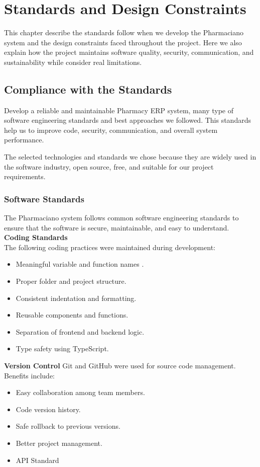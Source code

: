 \chapter{Standards and Design Constraints}
This chapter describe the standards follow when we develop the Pharmaciano system and the design constraints faced throughout the project. Here we also explain how the project maintains software quality, security, communication, and sustainability while consider real limitations.

\section{Compliance with the Standards}
Develop a reliable and maintainable Pharmacy ERP system, many type of software engineering standards and best approaches we followed. This standards help us to improve code, security, communication, and overall system performance.

The selected technologies and standards we chose because they are widely used in the software industry, open source, free, and suitable for our project requirements.

\subsection{Software Standards}
The Pharmaciano system follows common software engineering standards to ensure that the software is secure, maintainable, and easy to understand.
\\
\textbf{Coding Standards}\\
The following coding practices were maintained during development:
\begin{itemize}
\item Meaningful variable and function names \cite{martin2008clean}.
\item Proper folder and project structure.
\item Consistent indentation and formatting.
\item Reusable components and functions.
\item Separation of frontend and backend logic.
\item Type safety using TypeScript.
\end{itemize}

\textbf{Version Control}
Git and GitHub were used for source code management.
Benefits include:
\begin{itemize}
\item Easy collaboration among team members.
\item Code version history.
\item Safe rollback to previous versions.
\item Better project management.
\item API Standard
\end{itemize}

